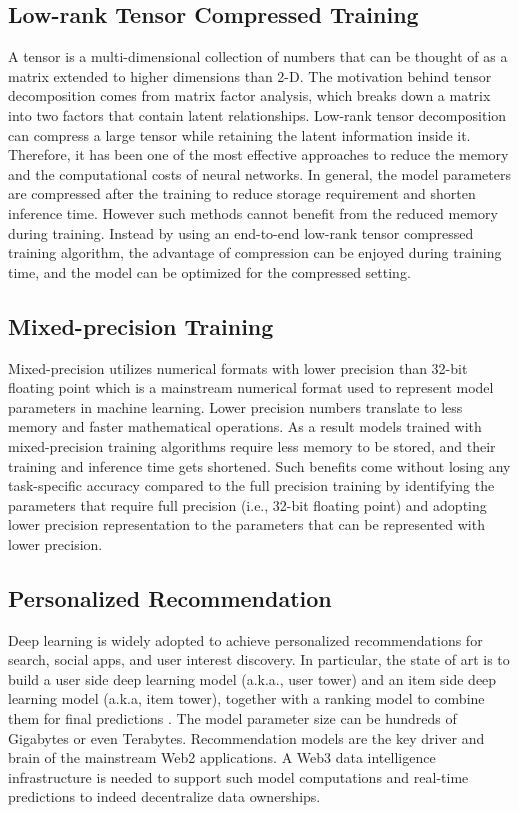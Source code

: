 \documentclass[11pt,letterpaper]{article}
\begin{document}
\subsection{Low-rank Tensor Compressed Training}
A tensor is a multi-dimensional collection of numbers that can be thought of as a matrix extended to higher dimensions than 2-D. The motivation behind tensor decomposition comes from matrix factor analysis, which breaks down a matrix into two factors that contain latent relationships. Low-rank tensor decomposition can compress a large tensor while retaining the latent information inside it. Therefore, it has been one of the most effective approaches to reduce the memory and the computational costs of neural networks. In general, the model parameters are compressed after the training to reduce storage requirement and shorten inference time. However such methods cannot benefit from the reduced memory during training. Instead by using an end-to-end low-rank tensor compressed training algorithm, the advantage of compression can be enjoyed during training time, and the model can be optimized for the compressed setting.

\subsection{Mixed-precision Training}
Mixed-precision utilizes numerical formats with lower precision than 32-bit floating point which is a mainstream numerical format used to represent model parameters in machine learning. Lower precision numbers translate to less memory and faster mathematical operations. As a result models trained with mixed-precision training algorithms require less memory to be stored, and their training and inference time gets shortened. Such benefits come without losing any task-specific accuracy compared to the full precision training by identifying the parameters that require full precision (i.e., 32-bit floating point) and adopting lower precision representation to the parameters that can be represented with lower precision. 

\subsection{Personalized Recommendation}
Deep learning is widely adopted to achieve personalized recommendations for search, social apps, and user interest discovery. In particular, the state of art is to build a user side deep learning model (a.k.a., user tower) and an item side deep learning model (a.k.a, item tower), together with a ranking model to combine them for final predictions \cite{DLRM19,ArchImpl19,QuoRemTrick19}. The model parameter size can be hundreds of Gigabytes or even Terabytes. Recommendation models are the key driver and brain of the mainstream Web2 applications. A Web3 data intelligence infrastructure is needed to support such model computations and real-time predictions to indeed decentralize data ownerships.
\end{document}
